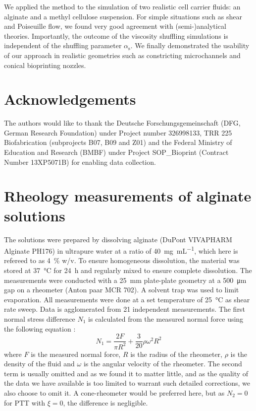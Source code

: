 \documentclass[a4paper,12pt]{scrartcl}
\begin{document}
We applied the method to the simulation of two realistic cell carrier fluids: an alginate and a methyl cellulose suspension.
For simple situations such as shear and Poiseuille flow, we found very good agreement with (semi-)analytical theories.
Importantly, the outcome of the viscosity shuffling simulations is independent of the shuffling parameter $\alpha_\text{s}$.
We finally demonstrated the usability of our approach in realistic geometries such as constricting microchannels and conical bioprinting nozzles.

\section{Acknowledgements}

The authors would like to thank the Deutsche Forschungsgemeinschaft (DFG, German Research Foundation) under Project number 326998133, TRR 225 Biofabrication (subprojects B07, B09 and Z01) and the Federal Ministry of Education and Research (BMBF) under Project SOP\_Bioprint (Contract Number 13XP5071B) for enabling data collection.



	\newpage
	\printbibliography[heading=bibintoc]


	\appendix
	\appendixpage


\section{Rheology measurements of alginate solutions}
\label{app:experiment}

The solutions were prepared by dissolving alginate (DuPont VIVAPHARM Alginate PH176) in ultrapure water at a ratio of \SI{40}{\milli\gram\per\milli\liter}, which here is refereed to as \SI{4}{\percent} w/v.
To ensure homogeneous dissolution, the material was stored at \SI{37}{\celsius} for \SI{24}{\hour} and regularly mixed to ensure complete dissolution.
The measurements were conducted with a \SI{25}{\milli\meter} plate-plate geometry at a \SI{500}{\micro\meter} gap on a rheometer (Anton paar MCR 702).
A solvent trap was used to limit evaporation.
All measurements were done at a set temperature of \SI{25}{\celsius} as shear rate sweep.
Data is agglomerated from 21 independent measurements.
The first normal stress difference $N_1$ is calculated from the measured normal force using the following equation \cite{kulicke1977}:
	\begin{equation}
		N_1 = \frac{2F}{\pi R^2} + \frac{3}{20}\rho\omega^2R^2
	\end{equation}
	where $F$ is the measured normal force, $R$ is the radius of the rheometer, $\rho$ is the density of the fluid and $\omega$ is the angular velocity of the rheometer. The second term is usually omitted and as we found it to matter little, and as the quality of the data we have available is too limited to warrant such detailed corrections, we also choose to omit it. A cone-rheometer would be preferred here, but as $N_2 = 0$ for PTT with $\xi = 0$, the difference is negligible.
\end{document}
